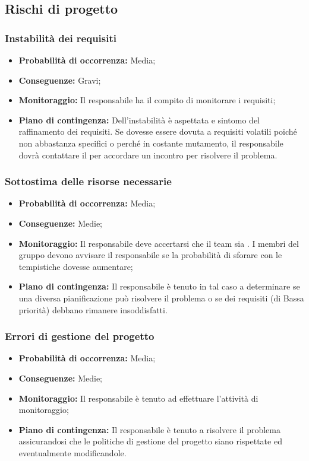 \subsection{Rischi di progetto}
\subsubsection{Instabilità dei requisiti}
\begin{itemize}
\item \textbf{Probabilità di occorrenza:} Media;
\item \textbf{Conseguenze:} Gravi;
\item \textbf{Monitoraggio:} Il responsabile ha il compito di monitorare i requisiti;
\item \textbf{Piano di contingenza:} Dell'instabilità è aspettata e sintomo del raffinamento dei requisiti.	Se dovesse essere dovuta a requisiti volatili poiché non abbastanza specifici o perché in costante mutamento, il responsabile dovrà contattare il  per accordare un incontro per risolvere il problema.
\end{itemize}
\subsubsection{Sottostima delle risorse necessarie}
\begin{itemize}
\item \textbf{Probabilità di occorrenza:} Media;
\item \textbf{Conseguenze:} Medie;
\item \textbf{Monitoraggio:} Il responsabile deve accertarsi che il team sia . I membri del gruppo devono avvisare il responsabile se la probabilità di sforare con le tempistiche dovesse aumentare;
\item \textbf{Piano di contingenza:} Il responsabile è tenuto in tal caso a determinare se una diversa pianificazione può risolvere il problema o se dei requisiti (di Bassa priorità) debbano rimanere insoddisfatti.
\end{itemize}
\subsubsection{Errori di gestione del progetto}
\begin{itemize}
\item \textbf{Probabilità di occorrenza:} Media;
\item \textbf{Conseguenze:} Medie;
\item \textbf{Monitoraggio:} Il responsabile è tenuto ad effettuare l'attività di monitoraggio;
\item \textbf{Piano di contingenza:} Il responsabile è tenuto a risolvere il problema assicurandosi che le politiche di gestione del progetto siano rispettate ed eventualmente modificandole.
\end{itemize}
\pagebreak